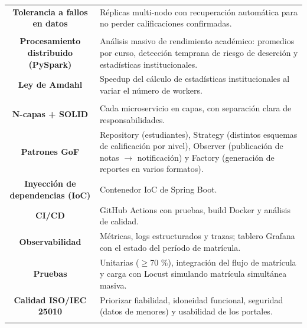 \documentclass[11pt]{article}
\begin{document}
\begin{longtable}{C A}
\textbf{Tolerancia a fallos en datos} & Réplicas multi-nodo con recuperación automática para no perder calificaciones confirmadas.\\
\addlinespace[1pt]
\\
\textbf{Procesamiento distribuido (PySpark)} & Análisis masivo de rendimiento académico: promedios por curso, detección temprana de riesgo de deserción y estadísticas institucionales.\\
\textbf{Ley de Amdahl} & Speedup del cálculo de estadísticas institucionales al variar el número de workers.\\
\addlinespace[1pt]
\\
\textbf{N-capas + SOLID} & Cada microservicio en capas, con separación clara de responsabilidades.\\
\textbf{Patrones GoF} & Repository (estudiantes), Strategy (distintos esquemas de calificación por nivel), Observer (publicación de notas $\rightarrow$ notificación) y Factory (generación de reportes en varios formatos).\\
\textbf{Inyección de dependencias (IoC)} & Contenedor IoC de Spring Boot.\\
\textbf{CI/CD} & GitHub Actions con pruebas, build Docker y análisis de calidad.\\
\textbf{Observabilidad} & Métricas, logs estructurados y trazas; tablero Grafana con el estado del período de matrícula.\\
\textbf{Pruebas} & Unitarias ($\geq$70 \%), integración del flujo de matrícula y carga con Locust simulando matrícula simultánea masiva.\\
\textbf{Calidad ISO/IEC 25010} & Priorizar fiabilidad, idoneidad funcional, seguridad (datos de menores) y usabilidad de los portales.\\
\addlinespace[1pt]
\end{longtable}
\end{document}
